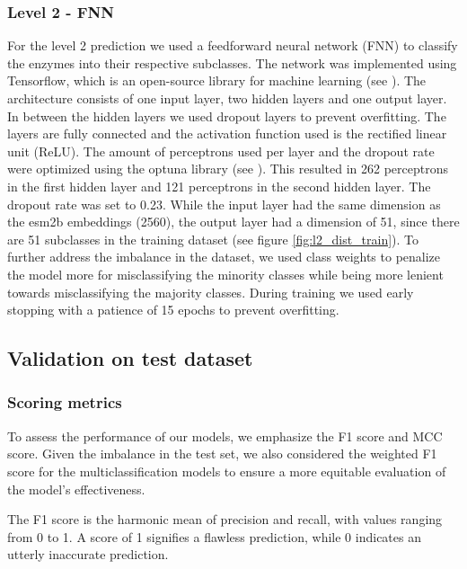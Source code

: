 \documentclass{bioinfo}
\begin{document}
\begin{methods}
\subsubsection{Level 2 - FNN}
For the level 2 prediction we used a feedforward neural network (FNN) to classify the enzymes into their respective subclasses.
The network was implemented using Tensorflow, which is an open-source library for machine learning (see \cite{tensorflow2015-whitepaper}).
The architecture consists of one input layer, two hidden layers and one output layer.
In between the hidden layers we used dropout layers to prevent overfitting.
The layers are fully connected and the activation function used is the rectified linear unit (ReLU).
The amount of perceptrons used per layer and the dropout rate were optimized using the optuna library (see \cite{optuna_2019}).
This resulted in 262 perceptrons in the first hidden layer and 121 perceptrons in the second hidden layer.
The dropout rate was set to 0.23.
While the input layer had the same dimension as the esm2b embeddings (2560), the output layer had a dimension of 51,
since there are 51 subclasses in the training dataset (see figure \ref{fig:l2_dist_train}).
To further address the imbalance in the dataset, we used class weights to penalize the model more for misclassifying the minority classes
while being more lenient towards misclassifying the majority classes.
During training we used early stopping with a patience of 15 epochs to prevent overfitting.


\subsection{Validation on test dataset}

\subsubsection{Scoring metrics}

To assess the performance of our models, we emphasize the F1 score and MCC score. 
Given the imbalance in the test set, we also considered the weighted F1 score for the multiclassification models
to ensure a more equitable evaluation of the model's effectiveness.

The F1 score is the harmonic mean of precision and recall, with values ranging from 0 to 1.
A score of 1 signifies a flawless prediction, while 0 indicates an utterly inaccurate prediction.


\end{methods}
\end{document}
